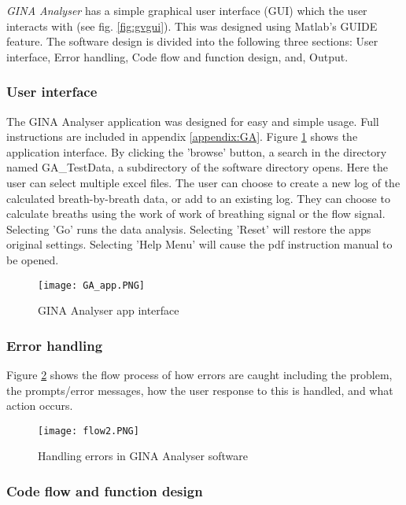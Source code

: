 \documentclass[12pt, openany, oneside]{book}
\begin{document}
\textit{GINA Analyser} has a simple graphical user interface (GUI) which the user interacts with (see fig. \ref{fig:gvgui}). This was designed using Matlab's GUIDE feature. The software design is divided into the following three sections: User interface, Error handling,  Code flow and function design, and, Output.

\subsubsection{User interface}

The GINA Analyser application was designed for easy and simple usage. Full instructions are included in appendix \ref{appendix:GA}. Figure \ref{fig:GA_app} shows the application interface.  By clicking the 'browse' button, a search in the directory named GA\_TestData, a subdirectory of the software directory opens. Here the user can  select multiple excel files.
The user can choose to create a new log of the calculated breath-by-breath data, or add to an existing log. They can choose to calculate breaths using the work of work of breathing signal or the flow signal. Selecting 'Go' runs the data analysis.  Selecting 'Reset' will restore the apps original settings. Selecting 'Help Menu' will cause the pdf instruction manual to be opened.

\begin{figure}[h!]
\centering
	\texttt{[image: GA\_app.PNG]}		
		\caption{GINA Analyser app interface}
		\label{fig:GA_app}
\end{figure}


\subsubsection{Error handling}
Figure \ref{fig:flow2} shows the flow process of how errors are caught including the problem, the prompts/error messages, how the user response to this is handled, and what action occurs.\\

\begin{landscape}
\begin{figure}
		\texttt{[image: flow2.PNG]}		
		\caption{Handling errors in GINA Analyser software}
		\label{fig:flow2}
\end{figure}
\end{landscape}

\subsubsection{Code flow and function design}
\end{document}
